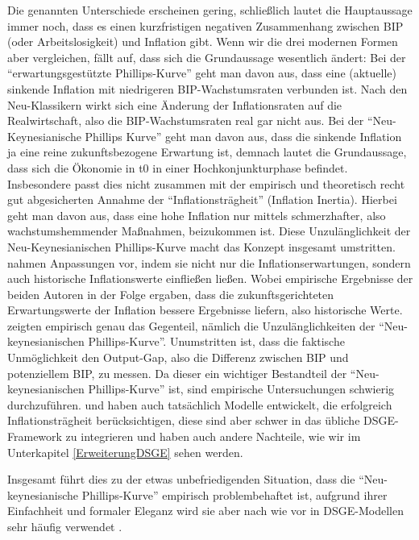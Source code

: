 Die genannten Unterschiede erscheinen gering, schließlich lautet die Hauptaussage immer noch, dass es einen kurzfristigen negativen Zusammenhang zwischen BIP (oder Arbeitslosigkeit) und Inflation gibt. Wenn wir die drei modernen Formen aber vergleichen, fällt auf, dass sich die Grundaussage wesentlich ändert: Bei der "`erwartungsgestützte Phillips-Kurve"' geht man davon aus, dass eine (aktuelle) sinkende Inflation mit niedrigeren BIP-Wachstumsraten verbunden ist. Nach den Neu-Klassikern wirkt sich eine Änderung der Inflationsraten auf die Realwirtschaft, also die BIP-Wachstumsraten real gar nicht aus. Bei der  "`Neu-Keynesianische Phillips Kurve"' geht man davon aus, dass die sinkende Inflation ja eine reine zukunftsbezogene Erwartung ist, demnach lautet die Grundaussage, dass sich die Ökonomie in t0 in einer Hochkonjunkturphase befindet. Insbesondere passt dies nicht zusammen mit der empirisch und theoretisch recht gut abgesicherten Annahme der "`Inflationsträgheit"' (Inflation Inertia). Hierbei geht man davon aus, dass eine hohe Inflation nur mittels schmerzhafter, also wachstumshemmender Maßnahmen, beizukommen ist.
Diese Unzulänglichkeit der Neu-Keynesianischen Phillips-Kurve macht das Konzept insgesamt umstritten. \textcite{Gali1999} nahmen Anpassungen vor, indem sie nicht nur die Inflationserwartungen, sondern auch historische Inflationswerte einfließen ließen. Wobei empirische Ergebnisse der beiden Autoren in der Folge ergaben, dass die zukunftsgerichteten Erwartungswerte der Inflation bessere Ergebnisse liefern, also historische Werte. \textcite{Rudd2005, Rudd2006} zeigten empirisch genau das Gegenteil, nämlich die Unzulänglichkeiten der "`Neu-keynesianischen Phillips-Kurve"'. Unumstritten ist, dass die faktische Unmöglichkeit den Output-Gap, also die Differenz zwischen BIP und potenziellem BIP, zu messen. Da dieser ein wichtiger Bestandteil der "`Neu-keynesianischen Phillips-Kurve"' ist, sind empirische Untersuchungen schwierig durchzuführen. \textcite{Mankiw2002} und \textcite{Christiano2005} haben auch tatsächlich Modelle entwickelt, die erfolgreich Inflationsträgheit berücksichtigen, diese sind aber schwer in das übliche DSGE-Framework zu integrieren und haben auch andere Nachteile, wie wir im Unterkapitel \ref{ErweiterungDSGE} sehen werden. 

Insgesamt führt dies zu der etwas unbefriedigenden Situation, dass die "`Neu-keynesianische Phillips-Kurve"' empirisch problembehaftet ist, aufgrund ihrer Einfachheit und formaler Eleganz wird sie aber nach wie vor in DSGE-Modellen sehr häufig verwendet \parencite[S. 341]{Romer2019}.


